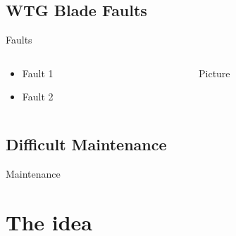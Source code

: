 \subsection{WTG Blade Faults}

\begin{frame}{Faults}
	\begin{columns}[T]
	\begin{column}{.48\textwidth}
		\begin{itemize}

			\item Fault 1
			\item Fault 2

		\end{itemize}
	\end{column}

	\begin{column}{.48\textwidth}

		Picture

	\end{column}
	\end{columns}
\end{frame}

\subsection{Difficult Maintenance}

\begin{frame}{Maintenance}
	
\end{frame}

\section{The idea}

